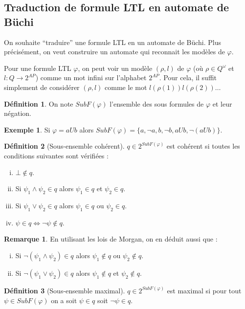 \documentclass[12pt,a4paper]{article}
\theoremstyle{plain}
\theoremstyle{definition}
\newtheorem{defi}{Définition}
\newtheorem{rmq}{Remarque}
\newtheorem{ex}{Exemple}
\begin{document}
\subsection{Traduction de formule LTL en automate de Büchi}
On souhaite ``traduire'' une formule LTL en un automate de Büchi.
Plus précisément, on veut construire un automate qui reconnait les modèles de $\varphi$.

Pour une formule LTL $\varphi$, on peut voir un modèle $(\rho, l)$ de $\varphi$ (où $\rho \in Q^\omega$ et $l : Q \to 2^{AP}$) comme un mot infini sur l'alphabet $2^{AP}$.
Pour cela, il suffit simplement de considérer $(\rho, l)$ comme le mot $l(\rho(1))l(\rho(2))\dots$


\begin{defi}
  On note $SubF(\varphi)$ l'ensemble des sous formules de $\varphi$ et leur négation.  
\end{defi}

\begin{ex}
  Si $\varphi = a U b$ alors $SubF(\varphi) = \{ a, \lnot a, b, \lnot b, a U b, \lnot(a U b)\}$.
\end{ex}

\begin{defi}[Sous-ensemble cohérent]
  $q \in 2^{SubF(\varphi)}$ est cohérent si toutes les conditions suivantes sont vérifiées :
  \begin{enumerate}[(i)]
  \item $\bot \not \in q$.
  \item Si $\psi_1 \land \psi_2 \in q$ alors $\psi_1 \in q$ et $\psi_2 \in q$.
  \item Si $\psi_1 \lor \psi_2 \in q$ alors $\psi_1 \in q$ ou $\psi_2 \in q$.
  \item $\psi \in q \iff \lnot \psi \not\in q$.
  \end{enumerate}
\end{defi}

\begin{rmq}
  En utilisant les lois de Morgan, on en déduit aussi que :
  \begin{enumerate}[(i)]
  \item Si $\lnot (\psi_1 \land \psi_2) \in q$ alors $\psi_1 \not \in q$ ou $\psi_2 \not \in q$.
  \item Si $\lnot (\psi_1 \lor \psi_2) \in q$ alors $\psi_1 \not \in q$ et $\psi_2 \not \in q$.
  \end{enumerate}
\end{rmq}


\begin{defi}[Sous-ensemble maximal]
  $q \in 2^{SubF(\varphi)}$ est maximal si pour tout $\psi \in SubF(\varphi)$ on a soit $\psi \in q$ soit $\lnot \psi \in q$.  
\end{defi}
\end{document}
